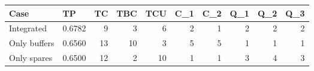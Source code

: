 \begin{tabular}{lLRRRRRRRR}
\hline
Case & TP & TC & TBC & TCU & C_1 & C_2 & Q_1 & Q_2 & Q_3 \\ 
\hline 
Integrated & 0.6782 & 9 & 3 & 6 & 2 & 1 & 2 & 2 & 2 \\ 
Only buffers & 0.6560 & 13 & 10 & 3 & 5 & 5 & 1 & 1 & 1 \\ 
Only spares & 0.6500 & 12 & 2 & 10 & 1 & 1 & 3 & 4 & 3 \\ 
\hline 
\end{tabular}